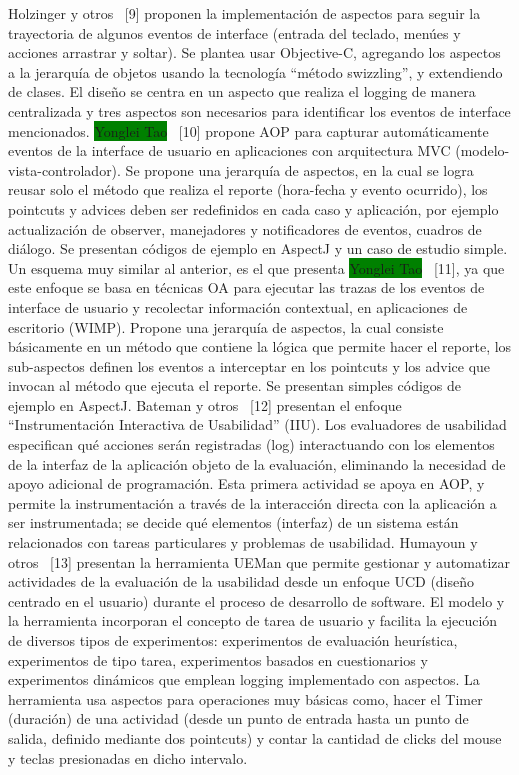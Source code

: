 Holzinger y otros~\cite{HBS2011} [9] proponen la implementación de aspectos para seguir la trayectoria de algunos eventos de interface (entrada del teclado, menúes y acciones arrastrar y soltar). Se plantea usar Objective-C, agregando los aspectos a la jerarquía de objetos usando la tecnología “método swizzling”, y extendiendo de clases. El diseño se centra en un aspecto que realiza el logging de manera centralizada y tres aspectos son necesarios para identificar los eventos de interface mencionados. 
\colorbox{green}{Yonglei Tao}~\cite{TAO2008} [10] propone AOP para capturar automáticamente eventos de la interface de usuario en aplicaciones con arquitectura MVC (modelo-vista-controlador). Se propone una jerarquía de aspectos, en la cual se logra reusar solo el método que realiza el reporte (hora-fecha y evento ocurrido), los pointcuts y advices deben ser redefinidos en cada caso y aplicación, por ejemplo actualización de observer, manejadores y notificadores de eventos, cuadros de diálogo. Se presentan códigos de ejemplo en AspectJ y un caso de estudio simple.  
Un esquema muy similar al anterior, es el que presenta \colorbox{green}{Yonglei Tao}~\cite{TAO2012} [11], ya que este enfoque se basa en técnicas OA para ejecutar las trazas de los eventos de interface de usuario y recolectar información contextual, en aplicaciones de escritorio (WIMP). Propone una jerarquía de aspectos, la cual consiste básicamente en un método  que contiene la lógica que permite hacer el reporte, los sub-aspectos definen los eventos a interceptar en los pointcuts y los advice que invocan al método que ejecuta el reporte. Se presentan simples códigos de ejemplo en AspectJ.
Bateman y otros~\cite{BGO+2009} [12] presentan el enfoque “Instrumentación Interactiva de Usabilidad” (IIU). Los evaluadores de usabilidad especifican qué acciones serán registradas (log) interactuando con los elementos de la interfaz de la aplicación objeto de la evaluación, eliminando la necesidad de apoyo adicional de programación. Esta primera actividad se apoya en AOP, y permite la instrumentación a través de la interacción directa con la aplicación a ser instrumentada; se decide qué elementos (interfaz) de un sistema están relacionados con tareas particulares y problemas de usabilidad. 
Humayoun y otros~\cite{HDC2009} [13] presentan la herramienta UEMan que permite gestionar y automatizar actividades de la evaluación de la usabilidad desde un enfoque UCD (diseño centrado en el usuario) durante el proceso de desarrollo de software. El modelo y la herramienta incorporan el concepto de tarea de usuario y facilita la ejecución de diversos tipos de experimentos: experimentos de evaluación heurística, experimentos de tipo tarea, experimentos basados en cuestionarios y experimentos dinámicos que emplean logging implementado con aspectos. La herramienta usa aspectos para operaciones muy básicas como, hacer el Timer (duración) de una actividad (desde un punto de entrada hasta un punto de salida, definido mediante dos pointcuts) y contar la cantidad de clicks del mouse y teclas presionadas en dicho intervalo.

